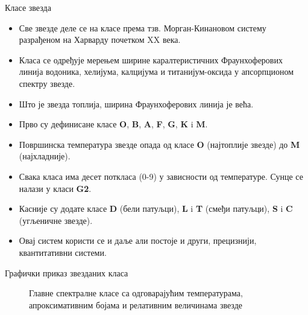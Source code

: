 \documentclass[aspectratio=169, xcolor=table, 10pt]{beamer}
\theoremstyle{definition}
\begin{document}
\begin{frame}{Класе звезда}
  \begin{itemize}
    \item Све звезде деле се на класе према тзв. Морган-Кинановом систему разрађеном на Харварду почетком XX века.
    \item Класа се одређује мерењем ширине каралтеристичних Фраунхоферових линија водоника, хелијума, калцијума и титанијум-оксида у апсорпционом спектру звезде.
    \item Што је звезда топлија, ширина Фраунхоферових линија је већа.
    \item Прво су дефинисане класе \textbf{O}, \textbf{B}, \textbf{A}, \textbf{F}, \textbf{G}, \textbf{K} i \textbf{M}.
    \item Површинска температура звезде опада од класе \textbf{O} (најтоплије звезде) до \textbf{M} (најхладније).
    \item Свака класа има десет поткласа (0-9) у зависности од температуре. Сунце се налази у класи \textbf{G2}.
    \item Касније су додате класе \textbf{D} (бели патуљци), \textbf{L} i \textbf{T} (смеђи патуљци), \textbf{S} i \textbf{C} (угљеничне звезде).
    \item Овај систем користи се и даље али постоје и други, прецизнији, квантитативни системи.
  \end{itemize}
\end{frame}

\begin{frame}{Графички приказ звезданих класа}
  \begin{figure}
    \centering
    \captionsetup{width=\wd0}
    \caption{Главне спектралне класе са одговарајућим температурама, апроксимативним бојама и релативним величинама звезде}
  \end{figure}
\end{frame}
\end{document}
